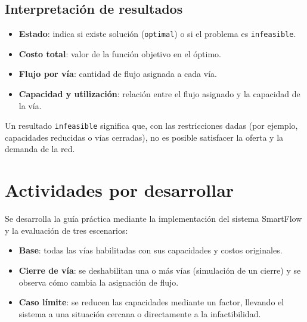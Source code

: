 \documentclass{article}
\begin{document}
\subsection{Interpretación de resultados}
\begin{itemize}
    \item \textbf{Estado}: indica si existe solución (\texttt{optimal}) o si el
          problema es \texttt{infeasible}.
    \item \textbf{Costo total}: valor de la función objetivo en el óptimo.
    \item \textbf{Flujo por vía}: cantidad de flujo asignada a cada vía.
    \item \textbf{Capacidad y utilización}: relación entre el flujo asignado y
          la capacidad de la vía.
\end{itemize}

Un resultado \texttt{infeasible} significa que, con las restricciones dadas
(por ejemplo, capacidades reducidas o vías cerradas), no es posible satisfacer
la oferta y la demanda de la red.

\section{Actividades por desarrollar}

Se desarrolla la guía práctica mediante la implementación del sistema SmartFlow
y la evaluación de tres escenarios:

\begin{itemize}
    \item \textbf{Base}: todas las vías habilitadas con sus capacidades y
          costos originales.
    \item \textbf{Cierre de vía}: se deshabilitan una o más vías (simulación de
          un cierre) y se observa cómo cambia la asignación de flujo.
    \item \textbf{Caso límite}: se reducen las capacidades mediante un factor,
          llevando el sistema a una situación cercana o directamente a la
          infactibilidad.
\end{itemize}

\end{document}
